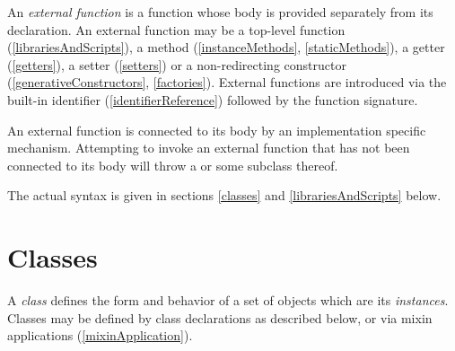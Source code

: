 \documentclass{article}
\begin{document}
\LMHash{}
An {\em external function} is a function whose body is provided separately from its declaration.
An external function may be a top-level function (\ref{librariesAndScripts}), a method (\ref{instanceMethods}, \ref{staticMethods}), a getter (\ref{getters}), a setter (\ref{setters}) or a non-redirecting constructor (\ref{generativeConstructors}, \ref{factories}).
External functions are introduced via the built-in identifier \EXTERNAL{} (\ref{identifierReference}) followed by the function signature.



\LMHash{}
An external function is connected to its body by an implementation specific mechanism.
Attempting to invoke an external function that has not been connected to its body will throw a  or some subclass thereof.

\LMHash{}
The actual syntax is given in sections \ref{classes} and \ref{librariesAndScripts} below.


\section{Classes}

\LMHash{}
A {\em class} defines the form and behavior of a set of objects which are its {\em instances}.
Classes may be defined by class declarations as described below, or via mixin applications (\ref{mixinApplication}).
\end{document}
